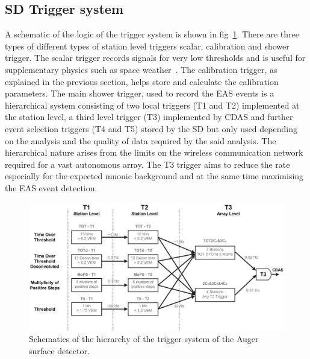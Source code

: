 \subsection{SD Trigger system}
\label{sec:Sur_det_trig}
A schematic of the logic of the trigger system is shown in fig~\ref{fig:SD_trigger_logic}. There are three types of different types of station level triggers scalar, calibration and shower trigger. The scalar trigger records signals for very low thresholds and is useful for supplementary physics such as space weather~\cite{Dasso:2012vk}. The calibration trigger, as explained in the previous section, helps store and calculate the calibration parameters. The main shower trigger, used to record the EAS events is a hierarchical system consisting of two local triggers (T1 and T2) implemented at the station level, a third level trigger (T3) implemented by CDAS and further event selection triggers (T4 and T5) stored by the SD but only used depending on the analysis and the quality of data required by the said analysis. The hierarchical nature arises from the limits on the wireless communication network required for a vast autonomous array. The T3 trigger aims to reduce the rate especially for the expected muonic background and at the same time maximising the EAS event detection.  

\begin{figure}[h!]
  \centering
  \includegraphics[width=\textwidth]{thesis_figures/Setup/Trigger_logic.png}
  \caption{Schematics of the hierarchy of the trigger system of the Auger surface detector.}
  \label{fig:SD_trigger_logic}
\end{figure}


